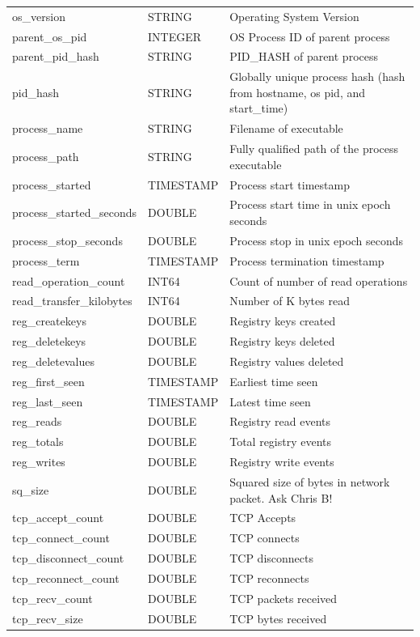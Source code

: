 \documentclass[conference,compsoc]{IEEEtran}
\begin{document}
\begin{longtable}{|p{5cm}|p{2cm}|p{9cm}|}
os\_version & STRING & Operating System Version \\
parent\_os\_pid & INTEGER & OS Process ID of parent process \\
parent\_pid\_hash & STRING & PID\_HASH of parent process \\
pid\_hash & STRING & Globally unique process hash (hash from hostname, os pid, and start\_time) \\
process\_name & STRING & Filename of executable \\
process\_path & STRING & Fully qualified path of the process executable \\
process\_started & TIMESTAMP & Process start timestamp \\
process\_started\_seconds & DOUBLE & Process start time in unix epoch seconds \\
process\_stop\_seconds & DOUBLE & Process stop in unix epoch seconds \\
process\_term & TIMESTAMP & Process termination timestamp \\
read\_operation\_count & INT64 & Count of number of read operations \\
read\_transfer\_kilobytes & INT64 & Number of K bytes read \\
reg\_createkeys & DOUBLE & Registry keys created \\
reg\_deletekeys & DOUBLE & Registry keys deleted \\
reg\_deletevalues & DOUBLE & Registry values deleted \\
reg\_first\_seen & TIMESTAMP & Earliest time seen \\
reg\_last\_seen & TIMESTAMP & Latest time seen \\
reg\_reads & DOUBLE & Registry read events \\
reg\_totals & DOUBLE & Total registry events \\
reg\_writes & DOUBLE & Registry write events \\
sq\_size & DOUBLE & Squared size of bytes in network packet. Ask Chris B! \\
tcp\_accept\_count & DOUBLE & TCP Accepts \\
tcp\_connect\_count & DOUBLE & TCP connects \\
tcp\_disconnect\_count & DOUBLE & TCP disconnects \\
tcp\_reconnect\_count & DOUBLE & TCP reconnects \\
tcp\_recv\_count & DOUBLE & TCP packets received \\
tcp\_recv\_size & DOUBLE & TCP bytes received \\

\end{longtable}
\end{document}
